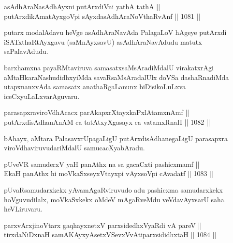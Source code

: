 \begin{shl}
asAdhAraNasAdhAyxni putArxdiVni yathA tathA || \\
putArxdikAmatAyxgoV\s pi sAyxdasAdhAraNoV\s thaRvAnf \hfill || 1081 ||  
\end{shl}

\begin{artha}
putarx modalAdavu heVge asAdhAraNavAda PalagaLoV hAgeye putArxdi iSATxthaRtAyxgavu (saMnAyxsavU) asAdhAraNavAdudu matutx saPalavAdudu.
\end{artha}

\begin{artha}
barxhamxna payaRMtaviruva samasatxsaMsAradiMdalU virakatxrAgi aMtaHkaraNashudidhxyiMda savaRsaMsAradalUlx doVSa dashaRnadiMda utapxnanxvAda samasatx anathaRgaLanunx biDisikoLuLxva iceCxyuLaLxvarAguvaru.
\end{artha}


\begin{shl}
parasapxraviroVdhAcacx parAkapxrXtayxkaPxlAtamxnAmf || \\
putArxdisAdhanAnAM ca tatAtxyXgasayx ca vatamxRnaH \hfill || 1082 ||  
\end{shl}

\begin{artha}
bAhayx, aMtara PalasavxrUpagaLigU putArxdisAdhanegaLigU parasapxra viroVdhaviruvudariMdalU samucacXyabAradu.
\end{artha}


\begin{shl}
pUveVR samuderxV yaH panAthx na sa gacaCxti pashicxmamf ||  \\
EkaH panAthx hi moVkaSxseyxVtayxpi vAyxsoV\s pi cAvadatf \hfill || 1083 ||  
\end{shl}

\begin{artha}
pUvaRsamudarxkekx yAvamAgaRviruvudo adu pashicxma samudarxkekx hoVguvudilalx, moVkaSxkekx oMdeV mAgaRveMdu veVdavAyxsarU saha heVLiruvaru.
\end{artha}



\begin{shl}
parxvArxjinoV\s tarx gaqhayxnetxV parxsidedhxVyaRdi vA pareV || \\
tirxdaNiDxnaH samAKAyxyAsetxVSevxVvAtiparxsididhxtaH \hfill || 1084 ||  
\end{shl}

